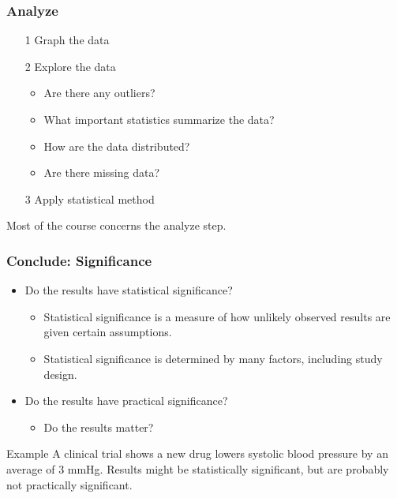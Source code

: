 \documentclass[xcolor=table, handout]{beamer}
\begin{document}
\begin{frame}
\frametitle{Analyze}
 
\begin{block}{}
\begin{itemize}
\item [1] Graph the data
\item [2] Explore the data
\begin{itemize}
\item Are there any outliers?
\item What important statistics summarize the data?
\item How are the data distributed?
\item Are there missing data?
\end{itemize}
\item [3] Apply statistical method
\end{itemize}
\end{block}

\begin{block}{}
Most of the course concerns the analyze step.
\end{block}
\end{frame}

\begin{frame}
\frametitle{Conclude: Significance}

\begin{block}{}
\begin{itemize}
\item Do the results have statistical significance?
\begin{itemize}
\item Statistical significance is a measure of how unlikely observed results are given certain assumptions.
\item Statistical significance is determined by many factors, including study design.
\end{itemize}
\item Do the results have practical significance?
\begin{itemize}
\item Do the results matter?
\end{itemize}
\end{itemize}
\end{block}

\pause
\begin{exampleblock}{Example}
A clinical trial shows a new drug lowers systolic blood pressure by an average of 3 mmHg. Results might be statistically significant, but are probably not practically significant.
\end{exampleblock}
\end{frame}
\end{document}
